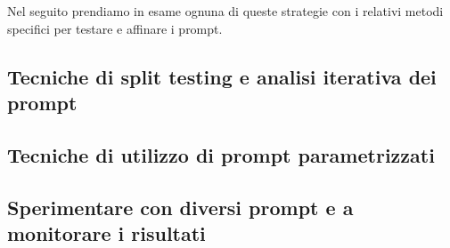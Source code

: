         Nel seguito prendiamo in esame ognuna di queste strategie con i relativi metodi specifici per testare e affinare i prompt.
    
    \subsection{Tecniche di split testing e analisi iterativa dei prompt}
    
    \subsection{Tecniche di utilizzo di prompt parametrizzati}
    
    \subsection{Sperimentare con diversi prompt e a monitorare i risultati}
